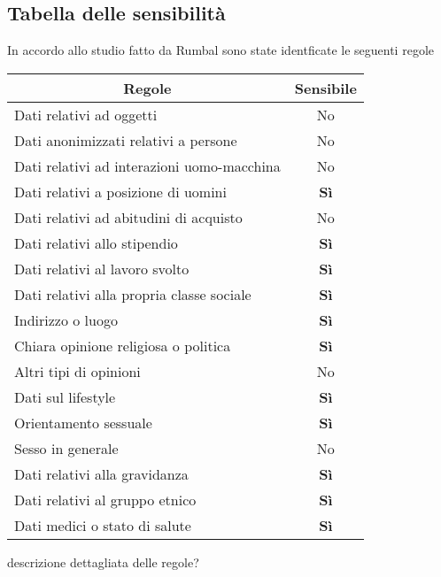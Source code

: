 \subsection{Tabella delle sensibilità}
In accordo allo studio fatto da Rumbal sono state identficate le seguenti regole
\FloatBarrier
\begin{table}[h]
\begin{tabular}{|l|c|}
\hline
\multicolumn{1}{|c|}{\textbf{Regole}} & \textbf{Sensibile} \\ \hline
Dati relativi ad oggetti & No \\ \hline
Dati anonimizzati relativi a persone & No \\ \hline
Dati relativi ad interazioni uomo-macchina & No \\ \hline
Dati relativi a posizione di uomini & \textbf{Sì} \\ \hline
Dati relativi ad abitudini di acquisto & No \\ \hline
Dati relativi allo stipendio & \textbf{Sì} \\ \hline
Dati relativi al lavoro svolto & \textbf{Sì} \\ \hline
Dati relativi alla propria classe sociale & \textbf{Sì} \\ \hline
Indirizzo o luogo & \textbf{Sì} \\ \hline
Chiara opinione religiosa o politica & \textbf{Sì} \\ \hline
Altri tipi di opinioni & No \\ \hline
Dati sul lifestyle & \textbf{Sì} \\ \hline
Orientamento sessuale & \textbf{Sì} \\ \hline
Sesso in generale & No \\ \hline
Dati relativi alla gravidanza & \textbf{Sì} \\ \hline
Dati relativi al gruppo etnico & \textbf{Sì} \\ \hline
Dati medici o stato di salute & \textbf{Sì} \\ \hline
\end{tabular}
\end{table}
\FloatBarrier
descrizione dettagliata delle regole?\newline
